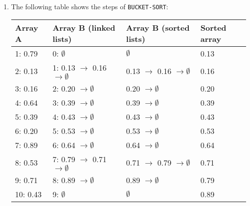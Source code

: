 \documentclass{article}
\begin{document}
\begin{enumerate}[1.]
    \item The following table shows the steps of \texttt{BUCKET-SORT}:
    	\begin{table}[h!t]
		\centering
		\begin{tabular}{llll}
			\toprule
			Array A & Array B (linked lists) & Array B (sorted lists) & Sorted array\\
			\midrule
			1: 0.79 & 0: $\emptyset$ & $\emptyset$ & 0.13 \\
			2: 0.13 & 1: 0.13 $\rightarrow$ 0.16 $\rightarrow \emptyset$ & 0.13 $\rightarrow$ 0.16 $\rightarrow \emptyset$ & 0.16 \\
			3: 0.16 & 2: 0.20 $\rightarrow \emptyset$ & 0.20 $\rightarrow \emptyset$ & 0.20 \\
			4: 0.64 & 3: 0.39 $\rightarrow \emptyset$ & 0.39 $\rightarrow \emptyset$ & 0.39 \\
			5: 0.39 & 4: 0.43 $\rightarrow \emptyset$ & 0.43 $\rightarrow \emptyset$ & 0.43 \\
			6: 0.20 & 5: 0.53 $\rightarrow \emptyset$ & 0.53 $\rightarrow \emptyset$ & 0.53 \\
			7: 0.89 & 6: 0.64 $\rightarrow \emptyset$ & 0.64 $\rightarrow \emptyset$ & 0.64 \\
			8: 0.53 & 7: 0.79 $\rightarrow$ 0.71 $\rightarrow \emptyset$ & 0.71 $\rightarrow$ 0.79 $\rightarrow \emptyset$ & 0.71 \\
			9: 0.71 & 8: 0.89 $\rightarrow \emptyset$ & 0.89 $\rightarrow \emptyset$ & 0.79 \\
			10: 0.43 & 9: $\emptyset$ & $\emptyset$ & 0.89 \\
			\bottomrule
		\end{tabular}
	    \end{table}
	    

\end{enumerate}
\end{document}
